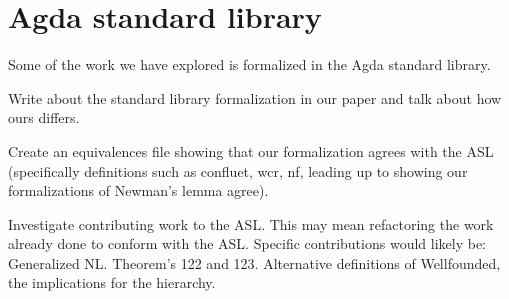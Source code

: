 \documentclass{article}
\begin{document}
\section*{Agda standard library}
Some of the work we have explored is formalized in the Agda standard library.  
\begin{todolist}
  \item Write about the standard library formalization in our paper and talk about how ours differs. 
  \item Create an equivalences file showing that our formalization agrees with the ASL (specifically definitions such as confluet, wcr, nf, leading up to showing our formalizations of Newman's lemma agree).
  \item Investigate contributing work to the ASL. This may mean refactoring the work already done to conform with the ASL. Specific contributions would likely be: Generalized NL. Theorem's 122 and 123. Alternative definitions of Wellfounded, the implications for the hierarchy.
\end{todolist}
\end{document}
